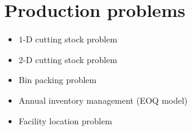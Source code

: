 \documentclass[]{report}
\begin{document}
\section{Production problems}
\begin{itemize}[label=$\circ$, leftmargin=*]
  \item 
    $1$-D cutting stock problem 
  \item 
    $2$-D cutting stock problem 
  \item 
    Bin packing problem
  \item 
    Annual inventory management (EOQ model)
  \item 
    Facility location problem
\end{itemize}
\end{document}
